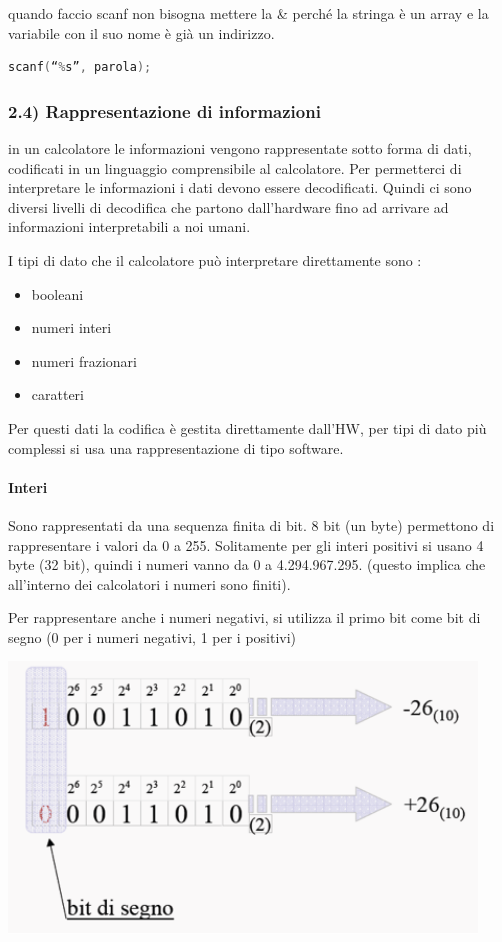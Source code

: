 \documentclass[
  paper=a4,
  oneside  ,captions=tableheading
]{scrbook}
\providecommand{\tightlist}{%
  \setlength{\itemsep}{0pt}\setlength{\parskip}{0pt}}
\begin{document}
quando faccio scanf non bisogna mettere la \& perché la stringa è un
array e la variabile con il suo nome è già un indirizzo.

\begin{lstlisting}[language={C++}]
scanf(“%s”, parola);
\end{lstlisting}

\hypertarget{rappresentazione-di-informazioni}{%
\subsubsection{2.4) Rappresentazione di
informazioni}\label{rappresentazione-di-informazioni}}

in un calcolatore le informazioni vengono rappresentate sotto forma di
dati, codificati in un linguaggio comprensibile al calcolatore. Per
permetterci di interpretare le informazioni i dati devono essere
decodificati. Quindi ci sono diversi livelli di decodifica che partono
dall'hardware fino ad arrivare ad informazioni interpretabili a noi
umani.

I tipi di dato che il calcolatore può interpretare direttamente sono :

\begin{itemize}
\tightlist
\item
  booleani
\item
  numeri interi
\item
  numeri frazionari
\item
  caratteri
\end{itemize}

Per questi dati la codifica è gestita direttamente dall'HW, per tipi di
dato più complessi si usa una rappresentazione di tipo software.

\hypertarget{interi}{%
\paragraph{Interi}\label{interi}}

Sono rappresentati da una sequenza finita di bit. 8 bit (un byte)
permettono di rappresentare i valori da 0 a 255. Solitamente per gli
interi positivi si usano 4 byte (32 bit), quindi i numeri vanno da 0 a
4.294.967.295. (questo implica che all'interno dei calcolatori i numeri
sono finiti).

Per rappresentare anche i numeri negativi, si utilizza il primo bit come
bit di segno (0 per i numeri negativi, 1 per i positivi)

\includegraphics{./image/image-20201212110945997.png}
\end{document}
